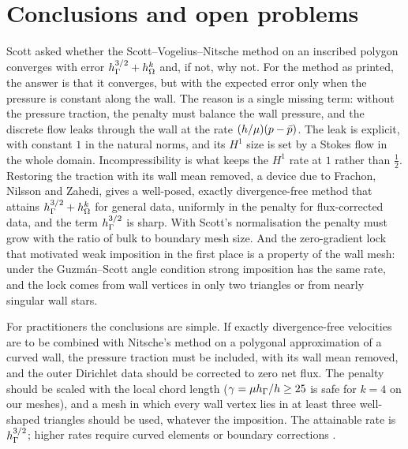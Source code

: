 \section{Conclusions and open problems}\label{sec:conclusions}

Scott asked whether the Scott--Vogelius--Nitsche method on an inscribed polygon converges with error $h_\Gamma^{3/2}+h_\Omega^k$ and, if not, why not. For the method as printed, the answer is that it converges, but with the expected error only when the pressure is constant along the wall. The reason is a single missing term: without the pressure traction, the penalty must balance the wall pressure, and the discrete flow leaks through the wall at the rate $(h/\mu)(p-\bar p)$. The leak is explicit, with constant $1$ in the natural norms, and its $H^1$ size is set by a Stokes flow in the whole domain. Incompressibility is what keeps the $H^1$ rate at $1$ rather than $\frac12$. Restoring the traction with its wall mean removed, a device due to Frachon, Nilsson and Zahedi, gives a well-posed, exactly divergence-free method that attains $h_\Gamma^{3/2}+h_\Omega^k$ for general data, uniformly in the penalty for flux-corrected data, and the term $h_\Gamma^{3/2}$ is sharp. With Scott's normalisation the penalty must grow with the ratio of bulk to boundary mesh size. And the zero-gradient lock that motivated weak imposition in the first place is a property of the wall mesh: under the Guzm\'an--Scott angle condition strong imposition has the same rate, and the lock comes from wall vertices in only two triangles or from nearly singular wall stars.

For practitioners the conclusions are simple. If exactly divergence-free velocities are to be combined with Nitsche's method on a polygonal approximation of a curved wall, the pressure traction must be included, with its wall mean removed, and the outer Dirichlet data should be corrected to zero net flux. The penalty should be scaled with the local chord length ($\gamma=\mu h_\Gamma/h\ge25$ is safe for $k=4$ on our meshes), and a mesh in which every wall vertex lies in at least three well-shaped triangles should be used, whatever the imposition. The attainable rate is $h_\Gamma^{3/2}$; higher rates require curved elements or boundary corrections \cite{NeilanOtus2021,DurstNeilan2024,LiuNeilanOtus2023,ChenLiu2026}.

